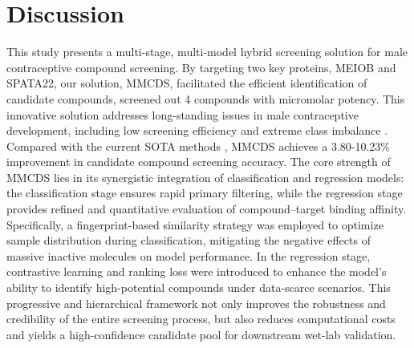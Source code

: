 \documentclass[preprint,12pt]{elsarticle}
\theoremstyle{plain}
\theoremstyle{definition}
\theoremstyle{remark}
\begin{document}
\section*{Discussion}


This study presents a multi-stage, multi-model hybrid screening solution for male contraceptive compound screening. By targeting two key proteins, MEIOB and SPATA22, our solution, MMCDS, facilitated the efficient identification of candidate compounds, screened out 4 compounds with micromolar potency. This innovative solution addresses long-standing issues in male contraceptive development, including low screening efficiency and extreme class imbalance \cite{54,55,56}. Compared with the current SOTA methods \cite{57,58}, MMCDS achieves a 3.80-10.23\% improvement in candidate compound screening accuracy. The core strength of MMCDS lies in its synergistic integration of classification and regression models: the classification stage ensures rapid primary filtering, while the regression stage provides refined and quantitative evaluation of compound–target binding affinity. Specifically, a fingerprint-based similarity strategy was employed to optimize sample distribution during classification, mitigating the negative effects of massive inactive molecules on model performance. In the regression stage, contrastive learning and ranking loss were introduced to enhance the model's ability to identify high-potential compounds under data-scarce scenarios. This progressive and hierarchical framework not only improves the robustness and credibility of the entire screening process, but also reduces computational costs and yields a high-confidence candidate pool for downstream wet-lab validation.
\end{document}
